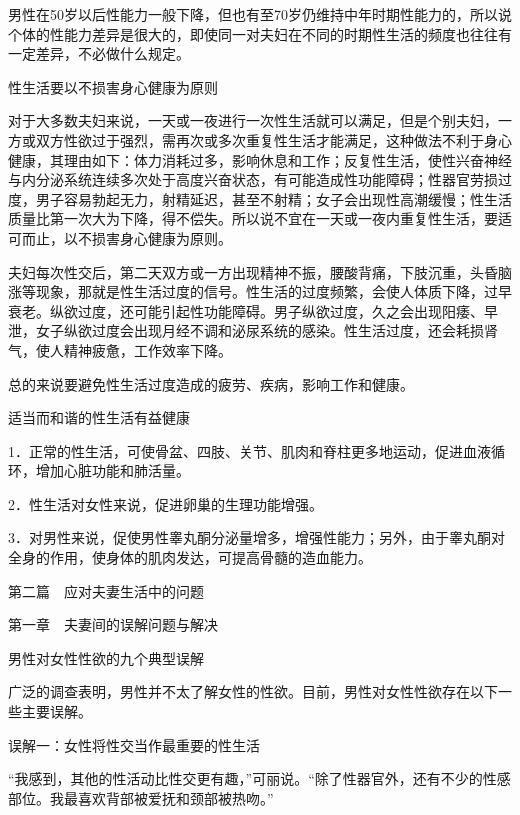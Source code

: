 \documentclass[12pt,UTF8]{ctexbook}
\begin{document}
男性在50岁以后性能力一般下降，但也有至70岁仍维持中年时期性能力的，所以说个体的性能力差异是很大的，即使同一对夫妇在不同的时期性生活的频度也往往有一定差异，不必做什么规定。





性生活要以不损害身心健康为原则


对于大多数夫妇来说，一天或一夜进行一次性生活就可以满足，但是个别夫妇，一方或双方性欲过于强烈，需再次或多次重复性生活才能满足，这种做法不利于身心健康，其理由如下：体力消耗过多，影响休息和工作；反复性生活，使性兴奋神经与内分泌系统连续多次处于高度兴奋状态，有可能造成性功能障碍；性器官劳损过度，男子容易勃起无力，射精延迟，甚至不射精；女子会出现性高潮缓慢；性生活质量比第一次大为下降，得不偿失。所以说不宜在一天或一夜内重复性生活，要适可而止，以不损害身心健康为原则。

夫妇每次性交后，第二天双方或一方出现精神不振，腰酸背痛，下肢沉重，头昏脑涨等现象，那就是性生活过度的信号。性生活的过度频繁，会使人体质下降，过早衰老。纵欲过度，还可能引起性功能障碍。男子纵欲过度，久之会出现阳痿、早泄，女子纵欲过度会出现月经不调和泌尿系统的感染。性生活过度，还会耗损肾气，使人精神疲惫，工作效率下降。

总的来说要避免性生活过度造成的疲劳、疾病，影响工作和健康。





适当而和谐的性生活有益健康


1．正常的性生活，可使骨盆、四肢、关节、肌肉和脊柱更多地运动，促进血液循环，增加心脏功能和肺活量。

2．性生活对女性来说，促进卵巢的生理功能增强。

3．对男性来说，促使男性睾丸酮分泌量增多，增强性能力；另外，由于睾丸酮对全身的作用，使身体的肌肉发达，可提高骨髓的造血能力。





第二篇　应对夫妻生活中的问题





第一章　夫妻间的误解问题与解决


男性对女性性欲的九个典型误解


广泛的调查表明，男性并不太了解女性的性欲。目前，男性对女性性欲存在以下一些主要误解。

误解一：女性将性交当作最重要的性生活

“我感到，其他的性活动比性交更有趣，”可丽说。“除了性器官外，还有不少的性感部位。我最喜欢背部被爱抚和颈部被热吻。”
\end{document}
